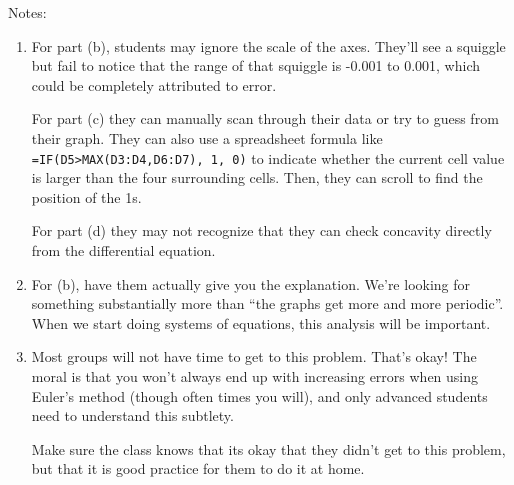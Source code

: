 		Notes:
		\begin{enumerate}
			\item For part (b), students may ignore the scale of the axes. They'll see a squiggle but fail to notice that the range of that
			squiggle is -0.001 to 0.001, which could be completely attributed to error.

			For part (c) they can manually scan through their data or try to guess from their graph. They can also use a spreadsheet formula
			like \verb|=IF(D5>MAX(D3:D4,D6:D7), 1, 0)| to indicate whether the current cell value is larger than the four surrounding cells.
			Then, they can scroll to find the position of the 1s.

			For part (d) they may not recognize that they can check concavity directly from the differential equation.

			\item For (b), have them actually give you the explanation. We're looking for something substantially more than ``the
			graphs get more and more periodic''. When we start doing systems of equations, this analysis will be important.

			\item Most groups will not have time to get to this problem. That's okay! The moral is that you won't always
			end up with increasing errors when using Euler's method (though often times you will), and only advanced students need
			to understand this subtlety.

			Make sure the class knows that its okay that they didn't get to this problem, but that it is good practice for them to do it at home.
		\end{enumerate}
